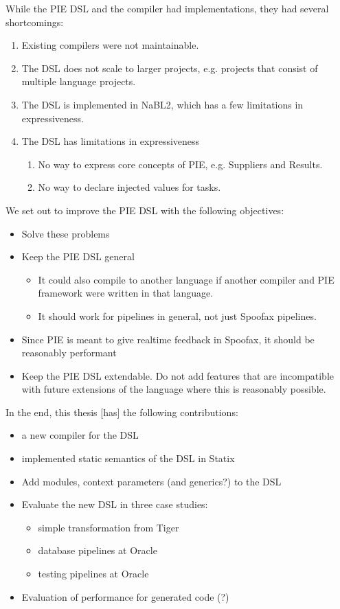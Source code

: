 While the PIE DSL and the compiler had implementations, they had several shortcomings:
\begin{enumerate}
  \item Existing compilers were not maintainable.
  \item The DSL does not scale to larger projects, e.g. projects that consist of multiple language projects.
  \item The DSL is implemented in NaBL2, which has a few limitations in expressiveness.
  \item The DSL has limitations in expressiveness
  \begin{enumerate}
    \item No way to express core concepts of PIE, e.g. Suppliers and Results.
    \item No way to declare injected values for tasks.
  \end{enumerate}
\end{enumerate}

We set out to improve the PIE DSL with the following objectives:
\begin{itemize}
  \item Solve these problems
  \item Keep the PIE DSL general
  \begin{itemize}
    \item It could also compile to another language if another compiler and PIE framework were written in that language.
    \item It should work for pipelines in general, not just Spoofax pipelines.
  \end{itemize}
  \item Since PIE is meant to give realtime feedback in Spoofax, it should be reasonably performant
  \item Keep the PIE DSL extendable. Do not add features that are incompatible with future extensions of the language where this is reasonably possible.
\end{itemize}

In the end, this thesis [has]  the following contributions:
\begin{itemize}
  \item a new compiler for the DSL
  \item implemented static semantics of the DSL in Statix
  \item Add modules, context parameters (and generics?) to the DSL
  \item Evaluate the new DSL in three case studies:
  \begin{itemize}
    \item simple transformation from Tiger
    \item database pipelines at Oracle
    \item testing pipelines at Oracle
  \end{itemize}
  \item Evaluation of performance for generated code (?)
\end{itemize}


